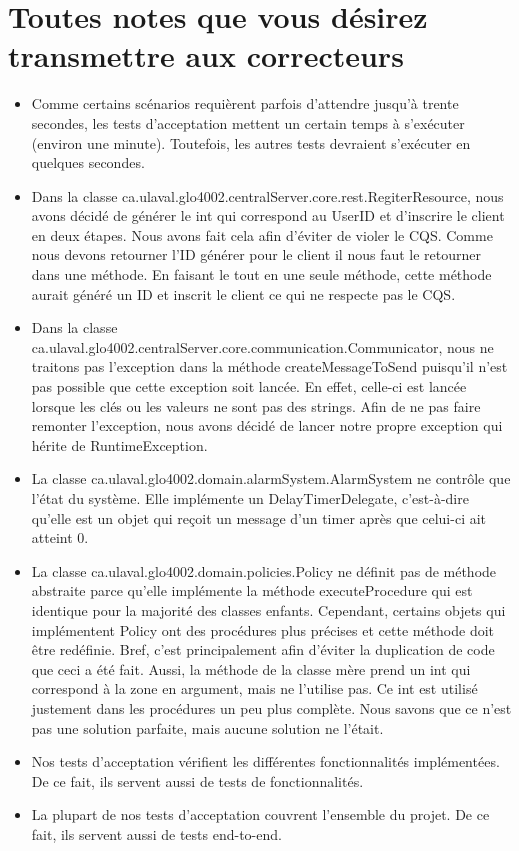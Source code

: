 \section*{Toutes notes que vous désirez transmettre aux correcteurs}
\begin{itemize}
	\item Comme certains scénarios requièrent parfois d'attendre jusqu'à trente secondes, les tests d'acceptation mettent un certain temps à s'exécuter (environ une minute). Toutefois, les autres tests devraient s'exécuter en quelques secondes.
	\item Dans la classe ca.ulaval.glo4002.centralServer.core.rest.RegiterResource, nous avons décidé de générer le int qui correspond au UserID et d'inscrire le client en deux étapes. Nous avons fait cela afin d'éviter de violer le CQS. Comme nous devons retourner l'ID générer pour le client il nous faut le retourner dans une méthode. En faisant le tout en une seule méthode, cette méthode aurait généré un ID et inscrit le client ce qui ne respecte pas le CQS. 
	\item Dans la classe ca.ulaval.glo4002.centralServer.core.communication.Communicator, nous ne traitons pas l'exception dans la méthode createMessageToSend puisqu'il n'est pas possible que cette exception soit lancée. En effet, celle-ci est lancée lorsque les clés ou les valeurs ne sont pas des strings. Afin de ne pas faire remonter l'exception, nous avons décidé de lancer notre propre exception qui hérite de RuntimeException.
	\item La classe ca.ulaval.glo4002.domain.alarmSystem.AlarmSystem ne contrôle que l'état du système. Elle implémente un DelayTimerDelegate, c'est-à-dire qu'elle est un objet qui reçoit un message d'un timer après que celui-ci ait atteint 0.
	\item La classe ca.ulaval.glo4002.domain.policies.Policy ne définit pas de méthode abstraite parce qu'elle implémente la méthode executeProcedure qui est identique pour la majorité des classes enfants. Cependant, certains objets qui implémentent Policy ont des procédures plus précises et cette méthode doit être redéfinie. Bref, c'est principalement afin d'éviter la duplication de code que ceci a été fait. Aussi, la méthode de la classe mère prend un int qui correspond à la zone en argument, mais ne l'utilise pas. Ce int est utilisé justement dans les procédures un peu plus complète. Nous savons que ce n'est pas une solution parfaite, mais aucune solution ne l'était.
	\item Nos tests d'acceptation vérifient les différentes fonctionnalités implémentées. De ce fait, ils servent aussi de tests de fonctionnalités.
	\item La plupart de nos tests d'acceptation couvrent l'ensemble du projet. De ce fait, ils servent aussi de tests end-to-end.	
\end{itemize}
